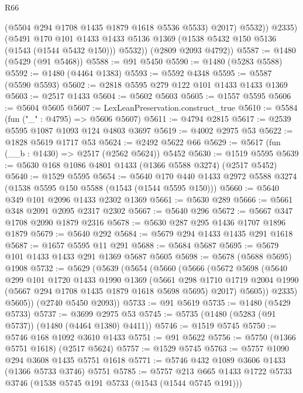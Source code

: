 \begin{lexlean}{R66}
\begin{coremodule}
                (@5504 @294 @1708 @1435 @1879 @1618 @5536 @5533)
                @2017)
              @5532))
          @2335)
        (@5491
          @170
          @101
          @1433
          @1433
          @5136
          @1369
          (@1538 @5432 @150 @5136 (@1543 (@1544 @5432 @150)))
          @5532))
      (@2809 @2093 @4792))
@5587 := @1480 (@5429 (@91 @5468))
@5588 := @91 @5450
@5590 := @1480 (@5283 @5588)
@5592 := @1480 (@4464 @1383)
@5593 := @5592 @4348
@5595 := @5587 (@5590 @5593)
@5602 := @2818 @5595 @279 @122 @101 @1433 @1433 @1369
@5603 := @2517 @1433
@5604 := @5602 @5603
@5605 := @1557 @5595
@5606 := @5604 @5605
@5607 := LexLeanPreservation.construct_true
@5610 := @5584 (fun ("_" : @4795) => @5606 @5607)
@5611 := @4794 @2815
@5617 := @2539 @5595 @1087 @1093 @124 @4803 @3697
@5619 := @4002 @2975 @53
@5622 := @1828 @5619 @1717 @53
@5624 := @2492 @5622 @66
@5629 := @5617 (fun (__b : @1430) => @2517 (@2562 @5624)) @5452
@5630 := @1519 @5595
@5639 := @5630 @168 @1086 @4801 @1433 (@1366 @5588 @3274) (@2517 @5452)
@5640 := @1529 @5595
@5654 := @5640 @170 @440 @1433 @2972 @5588 @3274 (@1538 @5595 @150 @5588 (@1543 (@1544 @5595 @150)))
@5660 := @5640 @349 @101 @2096 @1433 @2302 @1369
@5661 := @5630 @289
@5666 := @5661 @348 @2091 @2095 @2317 @2302
@5667 := @5640 @296
@5672 := @5667 @347 @1708 @2090 @1879 @2316
@5678 := @5630 @287 @295 @1436 @1707 @1896 @1879
@5679 := @5640 @292
@5684 := @5679 @294 @1433 @1435 @291 @1618
@5687 := @1657 @5595 @11 @291
@5688 := @5684 @5687
@5695 := @5679 @101 @1433 @1433 @291 @1369 @5687 @5605
@5698 := @5678 (@5688 @5695) @1908
@5732 := @5629
    (@5639
      (@5654
        (@5660
          (@5666
            (@5672
              @5698
              (@5640
                @299
                @101
                @1720
                @1433
                @1990
                @1369
                (@5661
                  @298
                  @1710
                  @1719
                  @2004
                  @1990
                  (@5667 @294 @1708 @1435 @1879 @1618 @5698 @5695)
                  @2017)
                @5605))
            @2335)
          @5605))
      (@2740 @5450 @2093))
@5733 := @91 @5619
@5735 := @1480 (@5429 @5733)
@5737 := @3699 @2975 @53
@5745 := @5735 (@1480 (@5283 (@91 @5737)) (@1480 (@4464 @1380) @4411))
@5746 := @1519 @5745
@5750 := @5746 @168 @1092 @3610 @1433
@5751 := @91 @5622
@5756 := @5750 (@1366 @5751 @1618) (@2517 @5624)
@5757 := @1529 @5745
@5763 := @5757 @1090 @294 @3608 @1435 @5751 @1618
@5771 := @5746 @432 @1089 @3606 @1433 (@1366 @5733 @3746) @5751
@5785 := @5757 @213 @665 @1433 @1722 @5733 @3746 (@1538 @5745 @191 @5733 (@1543 (@1544 @5745 @191)))

\end{coremodule}
\end{lexlean}
